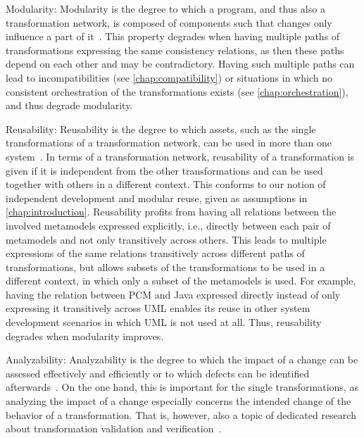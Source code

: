 \begin{properdescription}
    \item[Modularity:] 
    Modularity is the degree to which a program, and thus also a transformation network, is composed of components such that changes only influence a part of it~\cite[p.~14]{iso25010}.
    This property degrades when having multiple paths of transformations expressing the same consistency relations, as then these paths depend on each other and may be contradictory. 
    Having such multiple paths can lead to incompatibilities (see \autoref{chap:compatibility}) or situations in which no consistent orchestration of the transformations exists (see \autoref{chap:orchestration}), and thus degrade modularity.
    \item[Reusability:]
    Reusability is the degree to which assets, such as the single transformations of a transformation network, can be used in more than one system~\cite[p.~15]{iso25010}.
    In terms of a transformation network, reusability of a transformation is given if it is independent from the other transformations and can be used together with others in a different context.
    This conforms to our notion of independent development and modular reuse, given as assumptions in \autoref{chap:introduction}.
    Reusability profits from having all relations between the involved metamodels expressed explicitly, i.e., directly between each pair of metamodels and not only transitively across others.
    This leads to multiple expressions of the same relations transitively across different paths of transformations, but allows subsets of the transformations to be used in a different context, in which only a subset of the metamodels is used.
    For example, having the relation between \gls{PCM} and Java expressed directly instead of only expressing it transitively across \gls{UML} enables its reuse in other system development scenarios in which \gls{UML} is not used at all.
    Thus, reusability degrades when modularity improves.
    \item[Analyzability:] 
    Analyzability is the degree to which the impact of a change can be assessed effectively and efficiently or to which defects can be identified afterwards~\cite[p.~15]{iso25010}.
    On the one hand, this is important for the single transformations, as analyzing the impact of a change especially concerns the intended change of the behavior of a transformation. That is, however, also a topic of dedicated research about transformation validation and verification~\cite{cabot2010VerificationInvariants-JSS, rahim2015SurveyTransformationVerification-SoSym, azizi2017ContractVerification-ICCKE, vallecillo2012FormalTesting-FMMDE}.

\end{properdescription}
